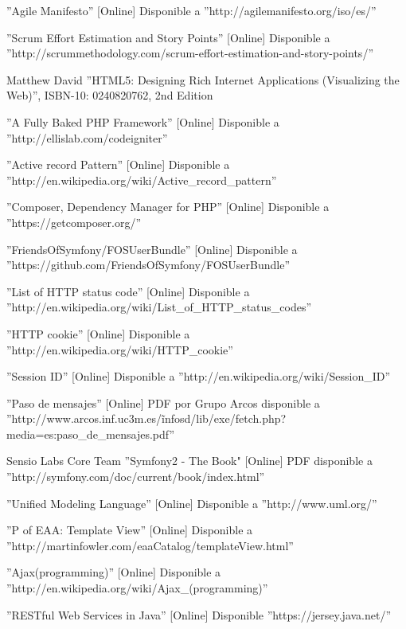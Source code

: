 \begin{thebibliography}{100}
 ''Agile Manifesto'' [Online] Disponible a ''http://agilemanifesto.org/iso/es/''

 ''Scrum Effort Estimation and Story Points'' [Online] Disponible a ''http://scrummethodology.com/scrum-effort-estimation-and-story-points/''

 Matthew David ''HTML5: Designing Rich Internet Applications (Visualizing the Web)'', ISBN-10: 0240820762, 2nd Edition

 ''A Fully Baked PHP Framework'' [Online] Disponible a ''http://ellislab.com/codeigniter''

 ''Active record Pattern'' [Online] Disponible a ''http://en.wikipedia.org/wiki/Active\_record\_pattern''

 ''Composer, Dependency Manager for PHP'' [Online] Disponible a ''https://getcomposer.org/''

 ''FriendsOfSymfony/FOSUserBundle'' [Online] Disponible a ''https://github.com/FriendsOfSymfony/FOSUserBundle''

 ''List of HTTP status code'' [Online] Disponible a ''http://en.wikipedia.org/wiki/List\_of\_HTTP\_status\_codes''

 ''HTTP cookie'' [Online] Disponible a ''http://en.wikipedia.org/wiki/HTTP\_cookie''

 ''Session ID'' [Online] Disponible a ''http://en.wikipedia.org/wiki/Session\_ID''

 ''Paso de mensajes'' [Online] PDF por Grupo Arcos disponible a  ''http://www.arcos.inf.uc3m.es/\~infosd/lib/exe/fetch.php?media=es:paso\_de\_mensajes.pdf''

 Sensio Labs Core Team ''Symfony2 - The Book" [Online] PDF disponible a  ''http://symfony.com/doc/current/book/index.html''

 ''Unified Modeling Language'' [Online] Disponible a ''http://www.uml.org/''

 ''P of EAA: Template View'' [Online] Disponible a ''http://martinfowler.com/eaaCatalog/templateView.html''

 ''Ajax(programming)'' [Online] Disponible a ''http://en.wikipedia.org/wiki/Ajax\_(programming)''

 ''RESTful Web Services in Java'' [Online] Disponible ''https://jersey.java.net/''


\end{thebibliography}
